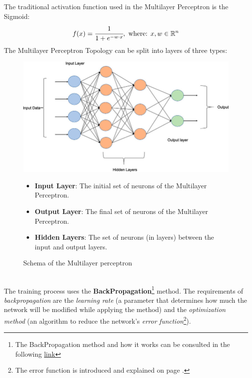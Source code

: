 \documentclass[a4paper, 11pt]{article}
\begin{document}
The traditional activation function used in the Multilayer Perceptron is the Sigmoid: 
\begin{equation*}
f(x) = \cfrac{1}{1+e^{-w\cdot x}},\text{ where: } x,w\in\mathbb{R}^n
\end{equation*}
The Multilayer Perceptron Topology can be split into layers of three types:
\begin{figure}[h]
    \begin{minipage}{9cm}
        \includegraphics[width = 1 \textwidth]{Neural_Network/Multi-layer-perceptron-MLP-NN-basic-Architecture.png}
        \caption{Schema of the Multilayer perceptron}
    \end{minipage}
    \hspace{1em}
    \begin{minipage}{5cm}
        \begin{itemize}
            \item \textbf{Input Layer}: The initial set of neurons of the Multilayer Perceptron.
            \item \textbf{Output Layer}: The final set of neurons of the Multilayer Perceptron.
            \item \textbf{Hidden Layers}: The set of neurons (in layers) between the input and output layers.
        \end{itemize}
    \end{minipage}
\end{figure}\\
\newpage
\hspace{-1.6em}The training process uses the \textbf{BackPropagation}\footnote{The BackPropagation method and how it works can be consulted in the following \href{https://en.wikipedia.org/wiki/Backpropagation}{link}} method. 
The requirements of \textit{backpropagation} are the \textit{learning rate} (a parameter that determines how much the network will be modified while applying the method) and the \textit{optimization method} (an algorithm to reduce the network's \textit{error function}\footnote{The error function is introduced and explained on page \pageref{whyworks}.}).\\ 
\end{document}
